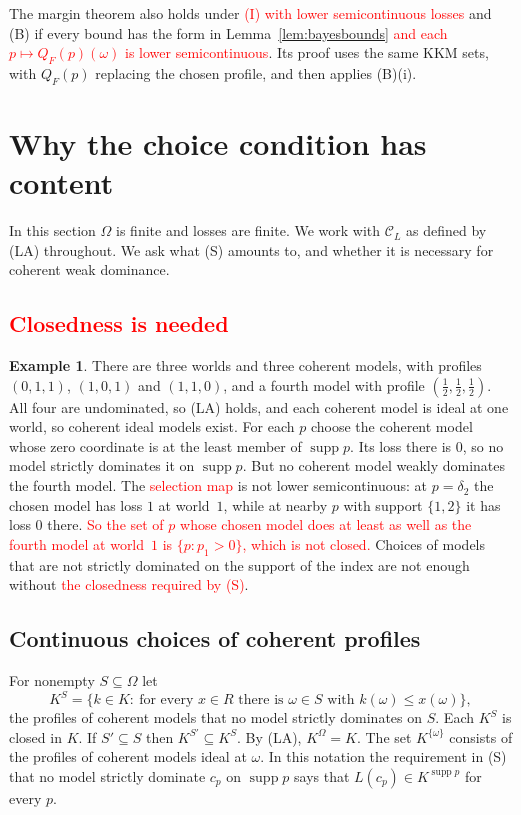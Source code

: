 \documentclass[11pt]{article}
\theoremstyle{definition}
\newtheorem{example}[theorem]{Example}
\theoremstyle{remark}
\newcommand{\C}{\mathcal C}
\newcommand{\supp}{\operatorname{supp}}
\begin{document}
The margin theorem also holds under \textcolor{red}{(I)} \textcolor{red}{with lower semicontinuous losses} and (B) if every bound has the form in Lemma~\ref{lem:bayesbounds} \textcolor{red}{and each $p\mapsto Q_F(p)(\omega)$ is lower semicontinuous}. Its proof uses the same KKM sets, with $Q_F(p)$ replacing the chosen profile, and then applies (B)(i).
\section{Why the choice condition has content}\label{sec:finite}
In this section $\Omega$ is finite and losses are finite. We work with $\C_L$ as defined by (LA) throughout. We ask what (S) amounts to, and whether it is necessary for coherent weak dominance.

\subsection{\textcolor{red}{Closedness is needed}}
\begin{example}\label{ex:continuity-needed}
There are three worlds and three coherent models, with profiles $(0,1,1)$, $(1,0,1)$ and $(1,1,0)$, and a fourth model with profile $(\tfrac12,\tfrac12,\tfrac12)$. All four are undominated, so (LA) holds, and each coherent model is ideal at one world, so coherent ideal models exist. For each $p$ choose the coherent model whose zero coordinate is at the least member of $\supp p$. Its loss there is $0$, so no model strictly dominates it on $\supp p$. But no coherent model weakly dominates the fourth model. The \textcolor{red}{selection map} is not lower semicontinuous: at $p=\delta_2$ the chosen model has loss $1$ at world~$1$, while at nearby $p$ with support $\{1,2\}$ it has loss $0$ there. \textcolor{red}{So the set of $p$ whose chosen model does at least as well as the fourth model at world~$1$ is $\{p:p_1>0\}$, which is not closed.} Choices of models that are not strictly dominated on the support of the index are not enough without \textcolor{red}{the closedness required by (S)}.
\end{example}

\subsection{Continuous choices of coherent profiles}\label{sec:connect}
For nonempty $S\subseteq\Omega$ let
\[
 K^S=\{k\in K:\ \text{for every }x\in R\text{ there is }\omega\in S\text{ with }k(\omega)\le x(\omega)\},
\]
the profiles of coherent models that no model strictly dominates on $S$. Each $K^S$ is closed in $K$. If $S'\subseteq S$ then $K^{S'}\subseteq K^S$. By (LA), $K^\Omega=K$. The set $K^{\{\omega\}}$ consists of the profiles of coherent models ideal at $\omega$. In this notation the requirement in (S) that no model strictly dominate $c_p$ on $\supp p$ says that $L(c_p)\in K^{\supp p}$ for every $p$.
\end{document}

